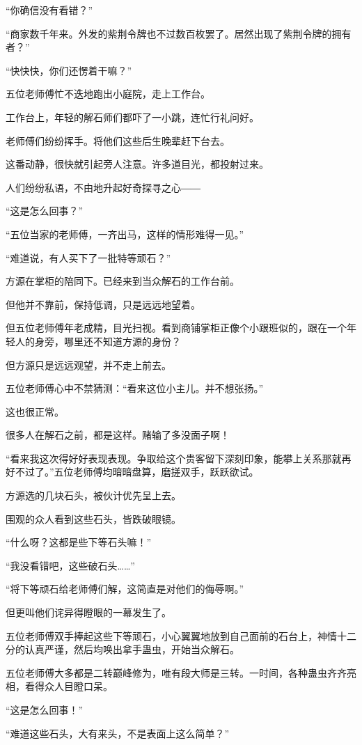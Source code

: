 \begin{this_body}
“你确信没有看错？”

“商家数千年来。外发的紫荆令牌也不过数百枚罢了。居然出现了紫荆令牌的拥有者？”

“快快快，你们还愣着干嘛？”

五位老师傅忙不迭地跑出小庭院，走上工作台。

工作台上，年轻的解石师们都吓了一小跳，连忙行礼问好。

老师傅们纷纷挥手。将他们这些后生晚辈赶下台去。

这番动静，很快就引起旁人注意。许多道目光，都投射过来。

人们纷纷私语，不由地升起好奇探寻之心――

“这是怎么回事？”

“五位当家的老师傅，一齐出马，这样的情形难得一见。”

“难道说，有人买下了一批特等顽石？”

方源在掌柜的陪同下。已经来到当众解石的工作台前。

但他并不靠前，保持低调，只是远远地望着。

但五位老师傅年老成精，目光扫视。看到商铺掌柜正像个小跟班似的，跟在一个年轻人的身旁，哪里还不知道方源的身份？

但方源只是远远观望，并不走上前去。

五位老师傅心中不禁猜测：“看来这位小主儿。并不想张扬。”

这也很正常。

很多人在解石之前，都是这样。赌输了多没面子啊！

“看来我这次得好好表现表现。争取给这个贵客留下深刻印象，能攀上关系那就再好不过了。”五位老师傅均暗暗盘算，磨搓双手，跃跃欲试。

方源选的几块石头，被伙计优先呈上去。

围观的众人看到这些石头，皆跌破眼镜。

“什么呀？这都是些下等石头嘛！”

“我没看错吧，这些破石头……”

“将下等顽石给老师傅们解，这简直是对他们的侮辱啊。”

但更叫他们诧异得瞪眼的一幕发生了。

五位老师傅双手捧起这些下等顽石，小心翼翼地放到自己面前的石台上，神情十二分的认真严谨，然后均唤出拿手蛊虫，开始当众解石。

五位老师傅大多都是二转巅峰修为，唯有段大师是三转。一时间，各种蛊虫齐齐亮相，看得众人目瞪口呆。

“这是怎么回事！”

“难道这些石头，大有来头，不是表面上这么简单？”


\end{this_body}
